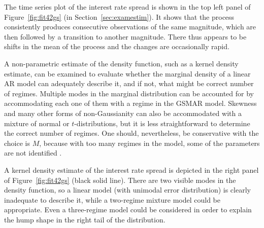 \documentclass[nojss]{jss} %
\begin{document}
The time series plot of the interest rate spread  is shown in the top left panel of Figure~\ref{fig:fit42gs} (in Section~\ref{sec:examestim}). It shows that the process consistently produces consecutive observations of the same magnitude, which are then followed by a transition to another magnitude. There thus appears to be shifts in the mean of the process and the changes are occasionally rapid. %

A non-parametric estimate of the density function, such as a kernel density estimate, can be examined to evaluate whether the marginal density of a linear AR model can adequately describe it, and if not, what might be correct number of regimes. Multiple modes in the marginal distribution can be accounted for by accommodating each one of them with a regime in the GSMAR model. Skewness and many other forms of non-Gaussianity can also be accommodated with a mixture of normal or $t$-distributions, but it is less straightforward to determine the correct number of regimes. One should, nevertheless, be conservative with the choice is $M$, because with too many regimes in the model, some of the parameters are not identified \cite[see][Sections 3.1 and 3.2.2 and the references therein]{Kalliovirta+Meitz+Saikkonen:2015}.

A kernel density estimate of the interest rate spread is depicted in the right panel of Figure~\ref{fig:fit42gs} (black solid line). There are two visible modes in the density function, so a linear model (with unimodal error distribution) is clearly inadequate to describe it, while a two-regime mixture model could be appropriate. Even a three-regime model could be considered in order to explain the hump shape in the right tail of the distribution.
\end{document}
